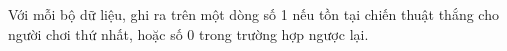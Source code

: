 Với mỗi bộ dữ liệu, ghi ra trên một dòng số 1 nếu tồn tại chiến thuật thắng cho người chơi thứ nhất, hoặc số 0 trong trường hợp ngược lại.